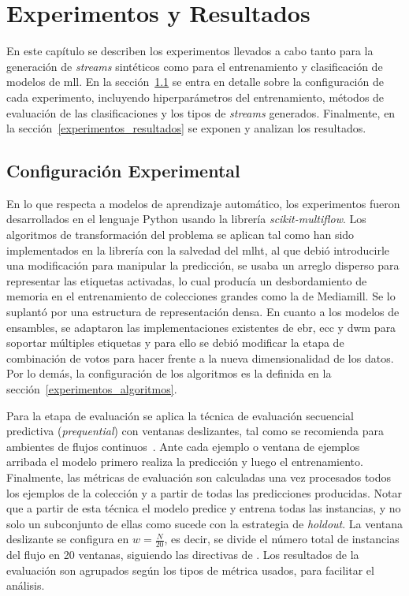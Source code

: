 \chapter{Experimentos y Resultados}
\label{chapter:experimentos}

En este capítulo se describen los experimentos llevados a cabo tanto para la
generación de \textit{streams} sintéticos como para el entrenamiento y
clasificación de modelos de \acrshort{mll}. En la
sección~\ref{configuracion_experimental} se entra en detalle sobre la
configuración de cada experimento, incluyendo hiperparámetros del entrenamiento,
métodos de evaluación de las clasificaciones y los tipos de \textit{streams}
generados. Finalmente, en la sección~\ref{experimentos_resultados} se exponen y
analizan los resultados.

\section{Configuración Experimental}
\label{configuracion_experimental}

En lo que respecta a modelos de aprendizaje automático, los experimentos fueron
desarrollados en el lenguaje Python usando la librería
\textit{scikit-multiflow}. Los algoritmos de transformación del problema se
aplican tal como han sido implementados en la librería con la salvedad del
\acrshort{mlht}, al que debió introducirle una modificación para manipular la
predicción, se usaba un arreglo disperso para representar las etiquetas
activadas, lo cual producía un desbordamiento de memoria en el entrenamiento de
colecciones grandes como la de Mediamill. Se lo suplantó por una estructura de
representación densa. En cuanto a los modelos de ensambles, se adaptaron las
implementaciones existentes de \acrshort{ebr}, \acrshort{ecc} y \acrshort{dwm}
para soportar múltiples etiquetas y para ello se debió modificar la etapa de
combinación de votos para hacer frente a la nueva dimensionalidad de los datos.
Por lo demás, la configuración de los algoritmos es la definida en la
sección~\ref{experimentos_algoritmos}.

Para la etapa de evaluación se aplica la técnica de evaluación secuencial
predictiva (\textit{prequential}) con ventanas deslizantes, tal como se
recomienda para ambientes de flujos continuos~\cite{gama_evaluating_2013}. Ante
cada ejemplo o ventana de ejemplos arribada el modelo primero realiza la
predicción y luego el entrenamiento. Finalmente, las métricas de evaluación son
calculadas una vez procesados todos los ejemplos de la colección y a partir de
todas las predicciones producidas.  Notar que a partir de esta técnica el modelo
predice y entrena todas las instancias, y no solo un subconjunto de ellas como
sucede con la estrategia de \textit{holdout}. La ventana deslizante se configura
en $w = \frac{N}{20}$, es decir, se divide el número total de instancias del
flujo en 20 ventanas, siguiendo las directivas de \textcite{read_scalable_2012}.
Los resultados de la evaluación son agrupados según los tipos de métrica usados,
para facilitar el análisis.

